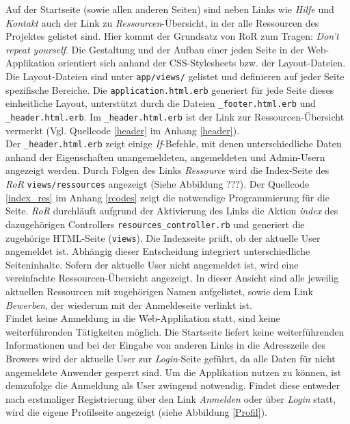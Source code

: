 \documentclass[a4paper,12pt,parskip,bibtotoc,liststotoc]{article}
\begin{document}
Auf der Startseite (sowie allen anderen Seiten) sind neben Links wie \textit{Hilfe} und \textit{Kontakt} auch der Link zu \textit{Ressourcen}-Übersicht, in der alle Ressourcen des Projektes gelistet sind. Hier kommt der Grundsatz von RoR zum Tragen: \textit{Don’t repeat yourself}. Die Gestaltung und der Aufbau einer jeden Seite in der Web-Applikation orientiert sich anhand der CSS-Stylesheets bzw. der Layout-Dateien. Die Layout-Dateien sind unter \texttt{app/views/} gelistet und definieren auf jeder Seite spezifische Bereiche. Die \texttt{application.html.erb} generiert für jede Seite dieses einheitliche Layout, unterstützt durch die Dateien \texttt{\_footer.html.erb} und \texttt{\_header.html.erb}. Im \texttt{\_header.html.erb} ist der Link zur Ressourcen-Übersicht vermerkt (Vgl. Quellcode \ref{header} im Anhang \ref{header}).\\

Der \texttt{\_header.html.erb} zeigt einige \textit{If}-Befehle, mit denen unterschiedliche Daten anhand der Eigenschaften unangemeldeten, angemeldeten und Admin-Usern angezeigt werden. Durch Folgen des Links \textit{Ressource} wird die Index-Seite des \textit{RoR} \texttt{views/ressources} angezeigt (Siehe Abbildung ???). Der Quellcode \ref{index_res} im Anhang \ref{rcodes} zeigt die notwendige Programmierung für die Seite. \textit{RoR} durchläuft aufgrund der Aktivierung des Links die Aktion \textit{index} des dazugehörigen Controllers \texttt{resources\_controller.rb} und generiert die zugehörige HTML-Seite (\texttt{views}). Die Indexseite prüft, ob der aktuelle User angemeldet ist. Abhängig dieser Entscheidung integriert  unterschiedliche Seiteninhalte. Sofern der aktuelle User nicht angemeldet ist, wird eine vereinfachte Ressourcen-Übersicht angezeigt. In dieser Ansicht sind alle jeweilig aktuellen Ressourcen mit zugehörigen Namen aufgelistet, sowie dem Link \textit{Bewerben}, der wiederum mit der Anmeldeseite verlinkt ist.\\

Findet keine Anmeldung in die Web-Applikation statt, sind keine weiterführenden Tätigkeiten möglich. Die Startseite liefert keine weiterführenden Informationen und bei der Eingabe von anderen Links in die Adresszeile des Browers wird der aktuelle User zur \textit{Login}-Seite geführt, da alle Daten für nicht angemeldete Anwender gesperrt sind. %
Um die Applikation nutzen zu können, ist demzufolge die Anmeldung als User zwingend notwendig. Findet diese entweder nach erstmaliger Registrierung über den Link \textit{Anmelden} oder über \textit{Login} statt, wird die eigene Profilseite angezeigt (siehe Abbildung \ref{Profil}).\\
\end{document}
